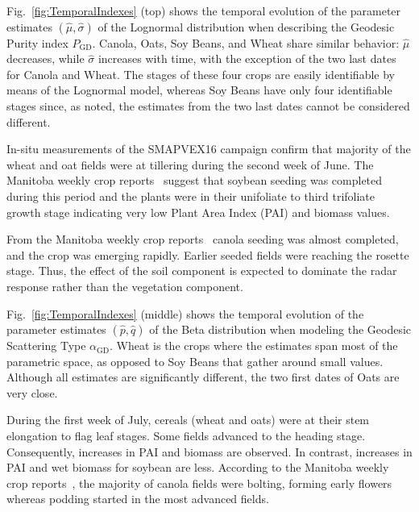 \documentclass[journal]{IEEEtran}
\begin{document}
	Fig.~\ref{fig:TemporalIndexes} (top) shows the temporal evolution of the parameter estimates $(\widehat\mu,\widehat\sigma)$ of the Lognormal distribution when describing the Geodesic Purity index $P_{\text{GD}}$.
	Canola, Oats, Soy Beans, and Wheat share similar behavior: $\widehat\mu$ decreases, while $\widehat\sigma$ increases with time, with the exception of the two last dates for Canola and Wheat.
	The stages of these four crops are easily identifiable by means of the Lognormal model, whereas Soy Beans have only four identifiable stages since, as noted, the estimates from the two last dates cannot be considered different.
	
	In-situ measurements of the SMAPVEX16 campaign confirm that majority of the wheat and oat fields were at tillering during the second week of June. The Manitoba weekly crop reports~\cite{manitobaagriculture} suggest that soybean seeding was completed during this period and the plants were in their unifoliate to third trifoliate growth stage indicating very low Plant Area Index (PAI) and biomass values.
	
	From the Manitoba weekly crop reports~\cite{manitobaagriculture} canola seeding was almost completed, and the crop was emerging rapidly. Earlier seeded fields were reaching the rosette stage. Thus, the effect of the soil component is expected to dominate the radar response rather than the vegetation component.
	
	Fig.~\ref{fig:TemporalIndexes} (middle) shows the temporal evolution of the parameter estimates $(\widehat p, \widehat q)$ of the Beta distribution when modeling the Geodesic Scattering Type $\alpha_{\text{GD}}$.
	Wheat is the crops where the estimates span most of the parametric space, as opposed to Soy Beans that gather around small values.
	Although all estimates are significantly different, the two first dates of Oats are very close.
	
	During the first week of July, cereals (wheat and oats) were at their stem elongation to flag leaf stages. Some fields advanced to the heading stage. Consequently, increases in PAI and biomass are observed. 
	In contrast, increases in PAI and wet biomass for soybean are less. According to the Manitoba weekly crop reports~\cite{manitobaagriculture}, the majority of canola fields were bolting, forming early flowers whereas podding started in the most advanced fields.
	
\end{document}
